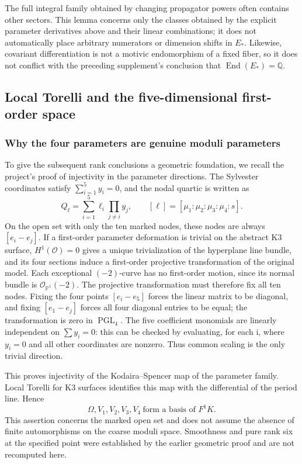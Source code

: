\documentclass[11pt,a4paper,oneside]{article}
\theoremstyle{plain}
\theoremstyle{definition}
\theoremstyle{remark}
\newcommand{\Q}{\mathbb Q}
\numberwithin{equation}{section}
\begin{document}
The full integral family obtained by changing propagator powers often contains other sectors.
This lemma concerns only the classes obtained by the explicit parameter derivatives above and their linear combinations; it does not automatically place arbitrary numerators or dimension shifts in $E_*$.
Likewise, covariant differentiation is not a motivic endomorphism of a fixed fiber, so it does not conflict with the preceding supplement's conclusion that $\operatorname{End}(E_*)=\Q$.


\subsection{Local Torelli and the five-dimensional first-order space}
\subsubsection{Why the four parameters are genuine moduli parameters}
To give the subsequent rank conclusions a geometric foundation, we recall the project's proof of injectivity in the parameter directions.
The Sylvester coordinates satisfy $\sum_{i=1}^5y_i=0$, and the nodal quartic is written as
\begin{equation}\label{deriv:eq:Sylvester}
 Q_\ell=\sum_{i=1}^5\ell_i\prod_{j\ne i}y_j,
 \qquad [\ell]=[\mu_1:\mu_2:\mu_3:\mu_4:s].
\end{equation}
On the open set with only the ten marked nodes, these nodes are always $[e_i-e_j]$.
If a first-order parameter deformation is trivial on the abstract K3 surface, $H^1(\mathcal O)=0$ gives a unique trivialization of the hyperplane line bundle, and its four sections induce a first-order projective transformation of the original model.
Each exceptional $(-2)$-curve has no first-order motion, since its normal bundle is $\mathcal O_{\mathbb P^1}(-2)$.
The projective transformation must therefore fix all ten nodes.
Fixing the four points $[e_i-e_5]$ forces the linear matrix to be diagonal, and fixing $[e_1-e_j]$ forces all four diagonal entries to be equal; the transformation is zero in $\operatorname{PGL}_4$.
The five coefficient monomials are linearly independent on $\sum y_i=0$: this can be checked by evaluating, for each i, where $y_i=0$ and all other coordinates are nonzero.
Thus common scaling is the only trivial direction.

This proves injectivity of the Kodaira--Spencer map of the parameter family.
Local Torelli for K3 surfaces identifies this map with the differential of the period line\cite[Chapter 6, Proposition 2.8]{huybrechts}.
Hence
\begin{equation}\label{deriv:eq:KS}
 \Omega,V_1,V_2,V_3,V_4\ \text{form a basis of }F^1K\text{}.
\end{equation}
This assertion concerns the marked open set and does not assume the absence of finite automorphisms on the coarse moduli space.
Smoothness and pure rank six at the specified point were established by the earlier geometric proof and are not recomputed here.
\end{document}
